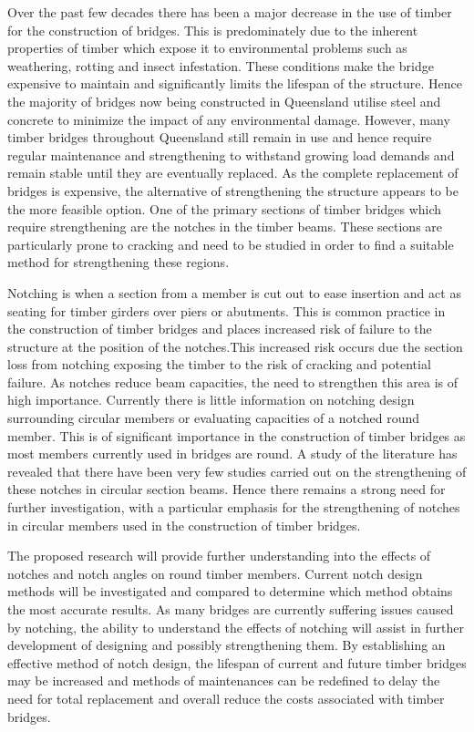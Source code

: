 \documentclass[11pt,a4paper]{article}
\numberwithin{equation}{subsection}
\begin{document}
    \noindent
    Over the past few decades there has been a major decrease in the use of timber for the construction of bridges. This is predominately due to the inherent properties of timber which expose it to environmental problems such as weathering, rotting and insect infestation. These conditions make the bridge expensive to maintain and significantly limits the lifespan of the structure.  Hence the majority of bridges now being constructed in Queensland utilise steel and concrete to minimize the impact of any environmental damage. However, many timber bridges throughout Queensland still remain in use and hence require regular maintenance and strengthening to withstand growing load demands and remain stable until they are eventually replaced. As the complete replacement of bridges is expensive, the alternative of strengthening the structure appears to be the more feasible option. One of the primary sections of timber bridges which require strengthening are the notches in the timber beams. These sections are particularly prone to cracking and need to be studied in order to find a suitable method for strengthening these regions.
	
	\vspace*{\baselineskip}
	
	\noindent
     Notching is when a section from a member is cut out to ease insertion and act as seating for timber girders over piers or abutments. This is common practice in the construction of timber bridges and places increased risk of failure to the structure at the position of the notches.This increased risk occurs due the section loss from notching exposing the timber to the risk of cracking and potential failure. As notches reduce beam capacities, the need to strengthen this area is of high importance. Currently there is little information on notching design surrounding circular members or evaluating capacities of a notched round member. This is of significant importance in the construction of timber bridges as most members currently used in bridges are round. A study of the literature has revealed that there have been very few studies carried out on the strengthening of these notches in circular section beams. Hence there remains a strong need for further investigation, with a particular emphasis for the strengthening of notches in circular members used in the construction of timber bridges. 
	
	\vspace*{\baselineskip}
	
	\noindent
    The proposed research will provide further understanding into the effects of notches and notch angles on round timber members. Current notch design methods will be investigated and compared to determine which method obtains the most accurate results. As many bridges are currently suffering issues caused by notching, the ability to understand the effects of notching will assist in further development of  designing and possibly strengthening them. By establishing an effective method of notch design, the lifespan of current and future timber bridges may be increased and methods of maintenances can be redefined to delay the need for total replacement and overall reduce the costs associated with timber bridges.  
	
\end{document}
